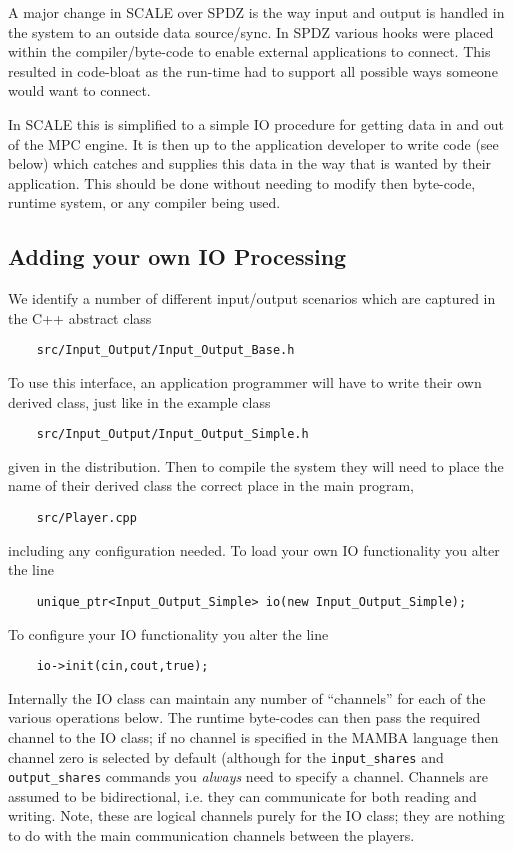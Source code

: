 \label{sec:IO}

A major change in SCALE over SPDZ is the way input and output
is handled in the system to an outside data source/sync.
In SPDZ various hooks were placed within the compiler/byte-code
to enable external applications to connect. This resulted in
code-bloat as the run-time had to support all possible
ways someone would want to connect.

In SCALE this is simplified to a simple IO procedure for
getting data in and out of the MPC engine. It is then up
to the application developer to write code (see below)
which catches and supplies this data in the way that is
wanted by their application.
This should be done without needing to modify then byte-code,
runtime system, or any compiler being used.

\subsection{Adding your own IO Processing}
We identify a number of different input/output scenarios
which are captured in the C++ abstract class 
\begin{verbatim}
    src/Input_Output/Input_Output_Base.h
\end{verbatim}
To use this interface, an application programmer will have to
write their own derived class, just like in the example
class
\begin{verbatim}
    src/Input_Output/Input_Output_Simple.h
\end{verbatim}
given in the distribution.
Then to compile the system they will need to place the
name of their derived class the correct place in the
main program, 
\begin{verbatim}
    src/Player.cpp
\end{verbatim}
including any configuration needed.
To load your own IO functionality you alter the line
\begin{verbatim}
    unique_ptr<Input_Output_Simple> io(new Input_Output_Simple);
\end{verbatim}
To configure your IO functionality you alter the line
\begin{verbatim}
    io->init(cin,cout,true);
\end{verbatim}
Internally the IO class can maintain any number of ``channels''
for each of the various operations below.
The runtime byte-codes can then pass the required channel to the 
IO class; if no channel is specified in the MAMBA language
then channel zero is selected by default (although for
the \verb+input_shares+ and \verb+output_shares+ commands
you {\em always} need to specify a channel.
Channels are assumed to be bidirectional, i.e. they can
communicate for both reading and writing.
Note, these are logical channels purely for the IO class;
they are nothing to do with the main communication channels
between the players.

